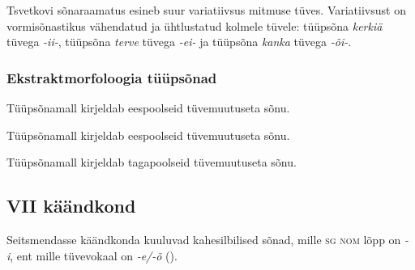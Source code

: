 \documentclass[12pt,a4paper]{article}
\newcommand{\vadja}[1]{\textit{#1}}
\newcommand{\msd}[1]{\textsc{#1}}
\begin{document}
Tsvetkovi sõnaraamatus esineb suur variatiivsus mitmuse tüves. Variatiivsust on vormi\-sõnastikus vähendatud ja ühtlustatud kolmele tüvele: tüüp\-sõna \textit{kerkiä} tüvega \textit{-ii-}, tüüpsõna \textit{terve} tüvega \textit{-ei-} ja tüüpsõna \textit{kanka} tüvega \textit{-õi-}.


\subsubsection*{Ekstraktmorfoloogia tüüpsõnad}
\vspace{-3.5em}

Tüüpsõna\-mall kirjeldab eespoolseid tüvemuutuseta sõnu.

Tüüpsõna\-mall kirjeldab eespoolseid tüvemuutuseta sõnu.

Tüüpsõna\-mall kirjeldab tagapoolseid tüvemuutuseta sõnu.

\subsection{\RN{7} käändkond}

Seitsmendasse käändkonda kuuluvad kahesilbilised sõnad, mille \msd{sg nom} lõpp on \vadja{-i}, ent mille tüvevokaal on \vadja{-e/-õ} (\cite[45]{ariste_grammar_1968}).

\end{document}
